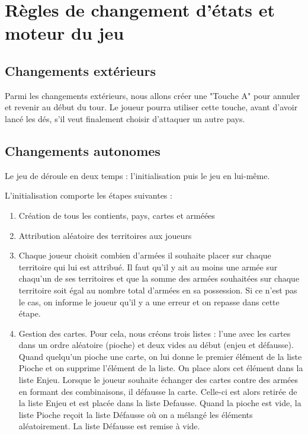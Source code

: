 \section{Règles de changement d'états et moteur du jeu}

\subsection{Changements extérieurs}
Parmi les changements extérieurs, nous allons créer une "Touche A" pour annuler et revenir au début du tour. Le joueur pourra utiliser cette touche, avant d'avoir lancé les dés, s'il veut finalement choisir d'attaquer un autre pays.


\subsection{Changements autonomes}

Le jeu de déroule en deux temps : l'initialisation puis le jeu en lui-même. 

\vspace{0.3cm}
L'initialisation comporte les étapes suivantes : 
\begin{enumerate}
    \item Création de tous les contients, pays, cartes et arméées
    \item Attribution aléatoire des territoires aux joueurs 
    \item Chaque joueur choisit combien d'armées il souhaite placer sur chaque territoire qui lui est attribué. Il faut qu'il y ait au moins une armée sur chaqu'un de ses territoires et que la somme des armées souhaitées sur chaque territoire soit égal au nombre total d'armées en sa possession. Si ce n'est pas le cas, on informe le joueur qu'il y a une erreur et on repasse dans cette étape.
    \item Gestion des cartes. Pour cela, nous créons trois listes :  l’une avec les cartes dans un ordre aléatoire (pioche) et deux vides au début (enjeu et défausse). Quand quelqu’un pioche une carte, on lui donne le premier élément de la liste Pioche et on supprime l’élément de la liste. On place alors cet élément dans la liste Enjeu. Lorsque le joueur souhaite échanger des cartes contre des armées en formant des combinaisons, il défausse la carte. Celle-ci est alors retirée de la liste Enjeu et est placée dans la liste Defausse. Quand la pioche est vide, la liste Pioche reçoit la liste Défausse où on a mélangé les éléments aléatoirement. La liste Défausse est remise à vide.
\end{enumerate}

